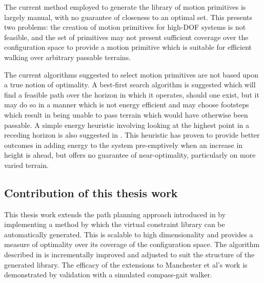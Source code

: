 The current method employed to generate the library of motion primitives is largely manual, with no guarantee of closeness to an optimal set. This presents two problems: the creation of motion primitives for high-DOF systems is not feasible, and the set of primitives may not present sufficient coverage over the configuration space to provide a motion primitive which is suitable for efficient walking over arbitrary passable terrains.

The current algorithms suggested to select motion primitives are not based upon a true notion of optimality. A best-first search algorithm is suggested which will find a feasible path over the horizon in which it operates, should one exist, but it may do so in a manner which is not energy efficient and may choose footsteps which result in being unable to pass terrain which would have otherwise been passable. A simple energy heuristic involving looking at the highest point in a receding horizon is also suggested in \cite{manchester13planning}. This heuristic has proven to provide better outcomes in adding energy to the system pre-emptively when an increase in height is ahead, but offers no guarantee of near-optimality, particularly on more varied terrain. 

\subsection{Contribution of this thesis work}
This thesis work extends the path planning approach introduced in \cite{manchester13planning} by implementing a method by which the virtual constraint library can be automatically generated. This is scalable to high dimensionality and provides a measure of optimality over its coverage of the configuration space. The algorithm described in \cite{manchester13planning} is incrementally improved and adjusted to suit the structure of the generated library. The efficacy of the extensions to Manchester et al's work is demonstrated by validation with a simulated compass-gait walker.